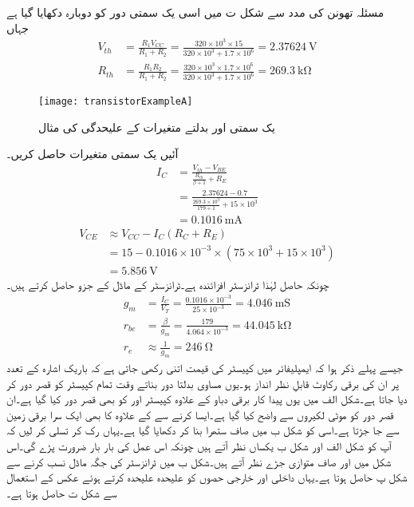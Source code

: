 مسئلہ تھونن کی مدد سے شکل  ت میں اسی یک سمتی دور کو دوبارہ دکھایا گیا ہے جہاں
\begin{align*}
V_{th}&=\frac{R_1 V_{CC}}{R_1+R_2}=\frac{320 \times 10^{3} \times 15}{320\times 10^{3}+1.7 \times 10^{6}}=\SI{2.37624}{\volt}\\
R_{th}&=\frac{R_1 R_2}{R_1+R_2}=\frac{320 \times 10^{3} \times 1.7 \times 10^{6}}{320 \times 10^{3}+1.7 \times 10^{6}}=\SI{269.3}{\kilo \ohm}
\end{align*}
%
\begin{figure}
\centering
\texttt{[image: transistorExampleA]}
\caption{یک سمتی اور بدلتے متغیرات کے علیحدگی کی مثال}
\label{شکل_مثال_کا_دور_الف}
\end{figure}
آئیں یک سمتی متغیرات حاصل کریں۔
\begin{align*}
I_C&=\frac{V_{th}-V_{BE}}{\frac{R_{th}}{\beta+1}+R_E}\\
&=\frac{2.37624-0.7}{\frac{269.3 \times 10^{3}}{179+1}+15\times 10^{3}}\\
&=\SI{0.1016}{ \milli \ampere}
\end{align*}
%
\begin{align*}
V_{CE} &\approx V_{CC}-I_C \left(R_C+R_E \right )\\
&=15-0.1016 \times 10^{-3} \times \left(75 \times 10^{3}+15 \times 10^{3} \right )\\
&=\SI{5.856}{\volt}
\end{align*}
چونکہ حاصل   لہٰذا ٹرانزسٹر افزائندہ ہے۔ٹرانزسٹر کے   ماڈل کے جزو حاصل کرتے ہیں۔
\begin{align*}
g_m &=\frac{I_C}{V_T} =\frac{0.1016 \times 10^{-3}}{25 \times 10^{-3}}=\SI{4.046}{\milli \siemens}\\
r_{be}&=\frac{\beta}{g_m}=\frac{179}{4.064 \times 10^{-3}} =\SI{44.045}{\kilo \ohm}\\
r_e & \approx \frac{1}{g_m}=\SI{246}{\ohm}
\end{align*}
جیسے پہلے ذکر ہوا کہ ایمپلیفائر میں کپیسٹر کی قیمت اتنی رکھی جاتی ہے کہ باریک اشارہ کے تعدد پر ان کی برقی رکاوٹ  قابلِ نظر انداز ہو۔یوں مساوی بدلتا دور بناتے وقت تمام کپیسٹر کو قصر دور کر دیا جاتا ہے۔شکل  الف میں یوں پیدا کار برقی دباو  کے علاوہ کپیسٹر   اور  کو بھی قصر دور کیا گیا ہے۔ان قصر دور کو موٹی لکیروں سے واضح کیا گیا ہے۔ایسا کرنے سے  کے علاوہ  کا بھی ایک سرا برقی زمین سے جا جڑتا ہے۔اسی کو شکل  ب میں صاف ستھرا بنا کر دکھایا گیا ہے۔یہاں رک کر تسلی کر لیں کہ آپ کو شکل  الف   اور شکل  ب یکساں نظر آتے ہیں چونکہ اس عمل کی بار بار ضرورت پڑے گی۔اس شکل میں   اور   صاف متوازی جڑے نظر آتے ہیں۔شکل  ب میں ٹرانزسٹر کی جگہ    ماڈل نسب کرنے سے شکل  پ حاصل ہوتا ہے۔یہاں داخلی اور خارجی حصوں کو علیحدہ علیحدہ کرتے ہوئے عکس  کے استعمال سے شکل  ت حاصل ہوتا ہے۔
